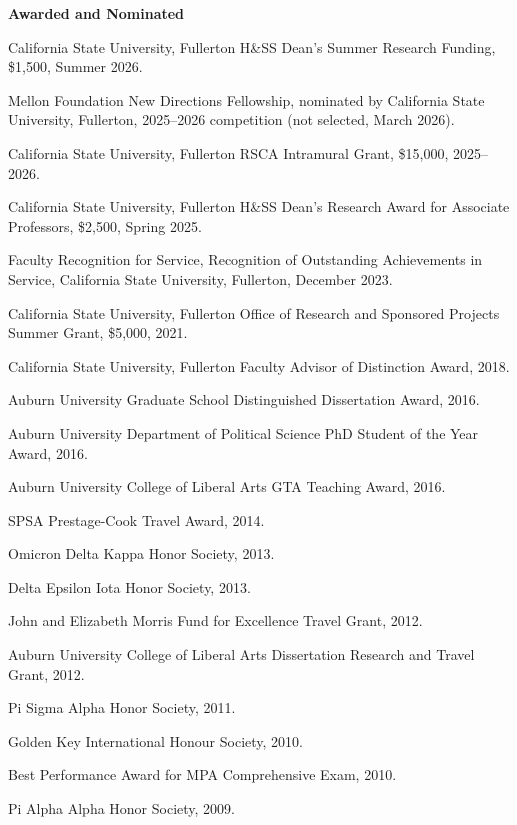 \documentclass[11pt,letterpaper]{article}
\renewenvironment{itemize}{
  \begin{list}{}{
    \setlength{\leftmargin}{1.5em}
    \setlength{\itemsep}{0.25em}
    \setlength{\parskip}{0pt}
    \setlength{\parsep}{0.25em}
  }
}{
  \end{list}
}
\begin{document}
\textbf{Awarded and Nominated}
\begin{itemize}\leftmargin=2pt\itemindent=-15pt
  \item California State University, Fullerton H\&SS Dean's Summer Research Funding, \$1,500, Summer 2026.
  \item Mellon Foundation New Directions Fellowship, nominated by California State University, Fullerton, 2025--2026 competition (not selected, March 2026).
  \item California State University, Fullerton RSCA Intramural Grant, \$15,000, 2025--2026.
  \item California State University, Fullerton H\&SS Dean's Research Award for Associate Professors, \$2,500, Spring 2025.
  \item Faculty Recognition for Service, Recognition of Outstanding Achievements in Service, California State University, Fullerton, December 2023.
  \item California State University, Fullerton Office of Research and Sponsored Projects Summer Grant, \$5,000, 2021.
  \item California State University, Fullerton Faculty Advisor of Distinction Award, 2018.
  \item Auburn University Graduate School Distinguished Dissertation Award, 2016.
  \item Auburn University Department of Political Science PhD Student of the Year Award, 2016.
  \item Auburn University College of Liberal Arts GTA Teaching Award, 2016.
  \item SPSA Prestage-Cook Travel Award, 2014.
  \item Omicron Delta Kappa Honor Society, 2013.
  \item Delta Epsilon Iota Honor Society, 2013.
  \item John and Elizabeth Morris Fund for Excellence Travel Grant, 2012.
  \item Auburn University College of Liberal Arts Dissertation Research and Travel Grant, 2012.
  \item Pi Sigma Alpha Honor Society, 2011.
  \item Golden Key International Honour Society, 2010.
  \item Best Performance Award for MPA Comprehensive Exam, 2010.
  \item Pi Alpha Alpha Honor Society, 2009.
\end{itemize}
\end{document}

